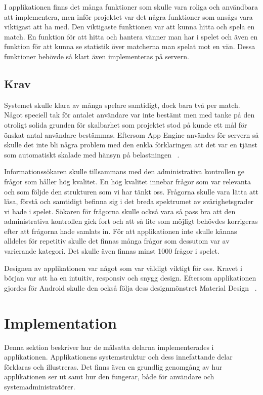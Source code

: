 \documentclass[a4paper, 11pt]{article}
\begin{document}
I applikationen finns det många funktioner som skulle vara roliga och användbara att implementera, men inför projektet var det några funktioner som ansågs vara viktigast att ha med. Den viktigaste funktionen var att kunna hitta och spela en match. En funktion för att hitta och hantera vänner man har i spelet och även en funktion för att kunna se statistik över matcherna man spelat mot en vän. Dessa funktioner behövde så klart även implementeras på servern.

\subsection{Krav}
Systemet skulle klara av många spelare samtidigt, dock bara två per match. Något speciell tak för antalet användare var inte bestämt men med tanke på den otroligt solida grunden för skalbarhet som projektet stod på kunde ett mål för önskat antal användare bestämmas. Eftersom App Engine användes för servern så skulle det inte bli några problem med den enkla förklaringen att det var en tjänst som automatiskt skalade med hänsyn på belastningen ~\cite{appenginescalability}. 

Informationssökaren skulle tillsammans med den administrativa kontrollen ge frågor som håller hög kvalitet. En hög kvalitet innebar frågor som var relevanta och som följde den strukturen som vi har tänkt oss. Frågorna skulle vara lätta att läsa, förstå och samtidigt befinna sig i det breda spektrumet av svårighetsgrader vi hade i spelet. Sökaren för frågorna skulle också vara så pass bra att den administrativa kontrollen gick fort och att så lite som möjligt behövdes korrigeras efter att frågorna hade samlats in. För att applikationen inte skulle kännas alldeles för repetitiv skulle det finnas många frågor som dessutom var av varierande kategori. Det skulle även finnas minst 1000 frågor i spelet.

Designen av applikationen var något som var väldigt viktigt för oss. Kravet i början var att ha en intuitiv, responsiv och snygg design. Eftersom applikationen gjordes för Android skulle den också följa dess designmönstret Material Design ~\cite{MaterialDesign}.

\section{Implementation}
Denna sektion beskriver hur de målsatta delarna implementerades i applikationen. Applikationens systemstruktur och dess innefattande delar  förklaras och illustreras. Det finns även en grundlig genomgång av hur applikationen ser ut samt hur den fungerar, både för användare och systemadministratörer.
\end{document}
